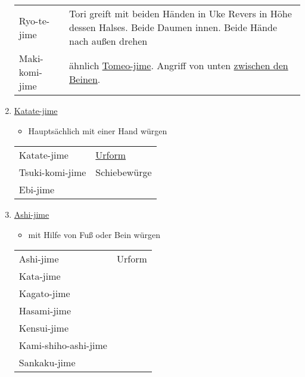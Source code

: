 \documentclass[justified, a4paper, notitlepage, captions=tableheading, nobib]{tufte-handout}
\begin{document}
\begin{enumerate}
\begin{center}
\begin{tabular}{ll}
\label{org0f55f76}Ryo-te-jime & Tori greift mit beiden Händen in Uke Revers in Höhe dessen Halses. Beide Daumen innen. Beide Hände nach außen drehen\\
\label{orga16281d}Maki-komi-jime & ähnlich \hyperref[org83e4891]{Tomeo-jime}. Angriff von unten \hyperref[org891f77f]{zwischen den Beinen}.\\
\end{tabular}
\end{center}

\item \hyperref[orgbcc0361]{Katate-jime}
\label{sec:org0f406f6}

\begin{itemize}
\item Hauptsächlich mit einer Hand würgen
\end{itemize}

\begin{center}
\begin{tabular}{ll}
\label{orgbcc0361}Katate-jime & \href{https://www.youtube.com/watch?v=aKEQKdlSjlE}{Urform}\\
\label{org47e81fd}Tsuki-komi-jime & \label{orge7ae3d1}Schiebewürge\\
\label{orgcea1797}Ebi-jime & \\
\end{tabular}
\end{center}

\item \hyperref[orga3793aa]{Ashi-jime}
\label{sec:org683cc72}

\begin{itemize}
\item mit Hilfe von Fuß oder Bein würgen
\end{itemize}

\begin{center}
\begin{tabular}{ll}
\label{orga3793aa}Ashi-jime & Urform\\
\label{org24ef5cd}Kata-jime & \\
\label{org0f4d879}Kagato-jime & \\
\label{orga49f349}Hasami-jime & \\
\label{orgf3fa491}Kensui-jime & \\
\label{org105cb03}Kami-shiho-ashi-jime & \\
\label{orgcb06698}Sankaku-jime & \\
\end{tabular}
\end{center}
\end{enumerate}
\end{document}
